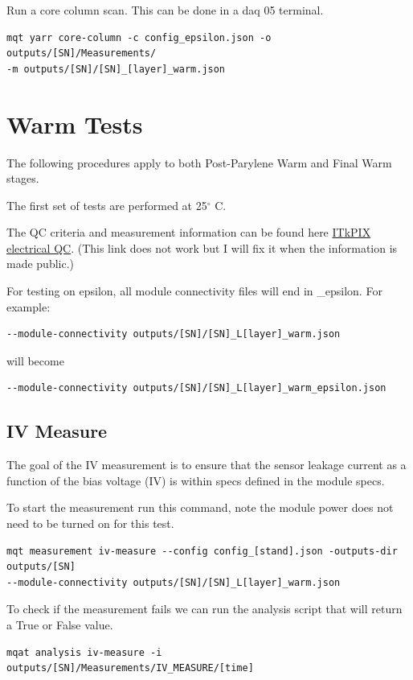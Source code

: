 \documentclass[12pt]{article}
\begin{document}
Run a core column scan. This can be done in a daq 05 terminal. 
\begin{verbatim}
mqt yarr core-column -c config_epsilon.json -o outputs/[SN]/Measurements/ 
-m outputs/[SN]/[SN]_[layer]_warm.json 
\end{verbatim}



\newpage
\section{Warm Tests}

The following procedures apply to both Post-Parylene Warm and Final Warm stages.

The first set of tests are performed at 25$^\circ$ C.

The QC criteria and measurement information can be found here \href{run:./ITkPix_electrical_QC-1.pdf}{ITkPIX electrical QC}. (This link does not work but I will fix it when the information is made public.)

For testing on epsilon, all module connectivity files will end in \_epsilon. For example:

\begin{verbatim}
--module-connectivity outputs/[SN]/[SN]_L[layer]_warm.json
\end{verbatim}
will become 
\begin{verbatim}
--module-connectivity outputs/[SN]/[SN]_L[layer]_warm_epsilon.json
\end{verbatim}

\subsection{IV Measure}
The goal of the IV measurement is to ensure that the sensor leakage current as a function of the bias voltage (IV) is within specs defined in the module specs. 

To start the measurement run this command, note the module power does not need to be turned on for this test.

\begin{verbatim}
mqt measurement iv-measure --config config_[stand].json -outputs-dir outputs/[SN]
--module-connectivity outputs/[SN]/[SN]_L[layer]_warm.json
\end{verbatim}

To check if the measurement fails we can run the analysis script that will return a True or False value. 
\begin{verbatim}
mqat analysis iv-measure -i outputs/[SN]/Measurements/IV_MEASURE/[time]
\end{verbatim}
\end{document}
